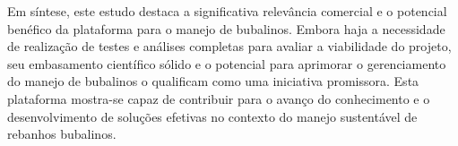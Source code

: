 Em síntese, este estudo destaca a significativa relevância comercial e o potencial benéfico da plataforma para o manejo de bubalinos. Embora haja a necessidade de realização de testes e análises completas para avaliar a viabilidade do projeto, seu embasamento científico sólido e o potencial para aprimorar o gerenciamento do manejo de bubalinos o qualificam como uma iniciativa promissora. Esta plataforma mostra-se capaz de contribuir para o avanço do conhecimento e o desenvolvimento de soluções efetivas no contexto do manejo sustentável de rebanhos bubalinos.

